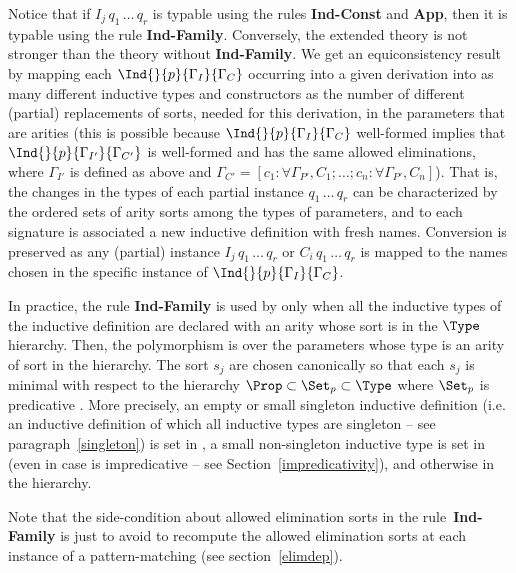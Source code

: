 Notice that if $I_j\,q_1\,\ldots\,q_r$ is typable using the rules {\bf
Ind-Const} and {\bf App}, then it is typable using the rule {\bf
Ind-Family}. Conversely, the extended theory is not stronger than the
theory without {\bf Ind-Family}. We get an equiconsistency result by
mapping each $\Ind{}{p}{\Gamma_I}{\Gamma_C}$ occurring into a
given derivation into as many different inductive types and constructors
as the number of different (partial) replacements of sorts, needed for
this derivation, in the parameters that are arities (this is possible
because $\Ind{}{p}{\Gamma_I}{\Gamma_C}$ well-formed implies
that $\Ind{}{p}{\Gamma_{I'}}{\Gamma_{C'}}$ is well-formed and
has the same allowed eliminations, where
$\Gamma_{I'}$ is defined as above and $\Gamma_{C'} = [c_1:\forall
\Gamma_{P'},C_1;\ldots;c_n:\forall \Gamma_{P'},C_n]$). That is,
the changes in the types of each partial instance
$q_1\,\ldots\,q_r$ can be characterized by the ordered sets of arity
sorts among the types of parameters, and to each signature is
associated a new inductive definition with fresh names. Conversion is
preserved as any (partial) instance $I_j\,q_1\,\ldots\,q_r$ or
$C_i\,q_1\,\ldots\,q_r$ is mapped to the names chosen in the specific
instance of $\Ind{}{p}{\Gamma_I}{\Gamma_C}$.

\newcommand{\Single}{\mbox{\textsf{Set}}}

In practice, the rule {\bf Ind-Family} is used by {\Coq} only when all the
inductive types of the inductive definition are declared with an arity whose 
sort is in the $\Type$
hierarchy. Then, the polymorphism is over the parameters whose
type is an arity of sort in the {\Type} hierarchy. 
The sort $s_j$ are
chosen canonically so that each $s_j$ is minimal with respect to the
hierarchy ${\Prop}\subset{\Set_p}\subset\Type$ where $\Set_p$ is
predicative {\Set}.
More precisely, an empty or small singleton inductive definition
(i.e. an inductive definition of which all inductive types are
singleton -- see paragraph~\ref{singleton}) is set in
{\Prop}, a small non-singleton inductive type is set in {\Set} (even
in case {\Set} is impredicative -- see Section~\ref{impredicativity}),
and otherwise in the {\Type} hierarchy.

Note that the side-condition about allowed elimination sorts in the
rule~{\bf Ind-Family} is just to avoid to recompute the allowed
elimination sorts at each instance of a pattern-matching (see
section~\ref{elimdep}).

